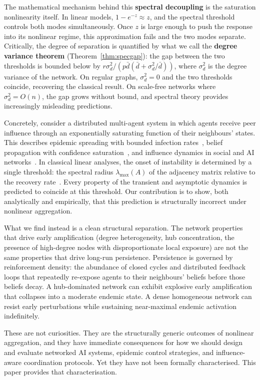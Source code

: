 \documentclass[10pt,twocolumn]{article}
\theoremstyle{myproof}
\newcommand{\lmax}{\lambda_{\max}}
\begin{document}
The mathematical mechanism behind this \textbf{spectral decoupling} is the saturation nonlinearity
itself. In linear models, $1 - e^{-z} \approx z$, and the spectral threshold controls both modes
simultaneously. Once $z$ is large enough to push the response into its nonlinear regime, this
approximation fails and the two modes separate. Critically, the degree of separation is quantified
by what we call the \textbf{degree variance theorem} (Theorem~\ref{thm:specgap}): the gap between
the two thresholds is bounded below by $r\sigma^2_d / (p\bar{d}(\bar{d} + \sigma^2_d/\bar{d}))$,
where $\sigma^2_d$ is the degree variance of the network. On regular graphs, $\sigma^2_d = 0$ and
the two thresholds coincide, recovering the classical result. On scale-free networks where
$\sigma^2_d = O(n)$, the gap grows without bound, and spectral theory provides increasingly
misleading predictions.

Concretely, consider a distributed multi-agent system in which agents receive peer influence
through an exponentially saturating function of their neighbours' states. This describes epidemic
spreading with bounded infection rates~\cite{pastor2001,pastor2015}, belief propagation with
confidence saturation~\cite{moreau2005,cao2013}, and influence dynamics in social and AI
networks~\cite{centola2007,dodds2004}. In classical linear analyses, the onset of instability is
determined by a single threshold: the spectral radius $\lmax(A)$ of the adjacency matrix relative
to the recovery rate~\cite{wang2003,vanmieghem2009}. Every property of the transient and
asymptotic dynamics is predicted to coincide at this threshold. Our contribution is to show, both
analytically and empirically, that this prediction is structurally incorrect under nonlinear
aggregation.

What we find instead is a clean structural separation. The network properties that drive early
amplification (degree heterogeneity, hub concentration, the presence of high-degree nodes with
disproportionate local exposure) are not the same properties that drive long-run persistence.
Persistence is governed by reinforcement density: the abundance of closed cycles and distributed
feedback loops that repeatedly re-expose agents to their neighbours' beliefs before those beliefs
decay. A hub-dominated network can exhibit explosive early amplification that collapses into a
moderate endemic state. A dense homogeneous network can resist early perturbations while
sustaining near-maximal endemic activation indefinitely.

These are not curiosities. They are the structurally generic outcomes of nonlinear aggregation,
and they have immediate consequences for how we should design and evaluate networked AI systems,
epidemic control strategies, and influence-aware coordination protocols. Yet they have not been
formally characterised. This paper provides that characterisation.
\end{document}
